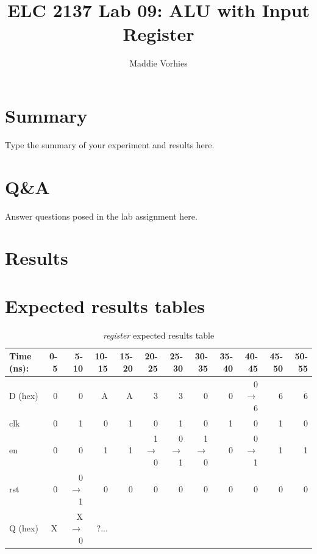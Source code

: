 \documentclass[11pt]{article}
\begin{document}
\title{ELC 2137 Lab 09: ALU with Input Register}
\author{Maddie Vorhies}

\maketitle


\section*{Summary}

Type the summary of your experiment and results here.  


\section*{Q\&A}

Answer questions posed in the lab assignment here.


\section*{Results}

\section*{Expected results tables}

\begin{table}[ht]\centering
	\caption{\textit{register} expected results table}
	\label{ALU:tbl:register_ERT}\medskip
	\begin{tabular}{l|rrrrrrrrrrr}
		Time (ns): & 0-5 & 5-10 & 10-15 & 15-20 & 20-25 & 25-30 & 30-35 & 35-40 & 40-45 & 45-50 & 50-55 \\
		\midrule
		D (hex) & 0 & 0 	  & A & A & 3 	    & 3 	  & 0 	    & 0 & 0$\to$6 & 6 & 6 \\
		clk     & 0 & 1 	  & 0 & 1 & 0 	    & 1 	  & 0 	    & 1 & 0 	  & 1 & 0 \\
		en  	& 0 & 0 	  & 1 & 1 & 1$\to$0 & 0$\to$1 & 1$\to$0 & 0 & 0$\to$1 & 1 & 1 \\
		rst 	& 0 & 0$\to$1 & 0 & 0 & 0 		& 0 	  & 0		& 0 & 0		  & 0 & 0 \\
		\midrule
		Q (hex) & X & X$\to$0 & ?... &  &  &  & & & & & \\
		\bottomrule
	\end{tabular}
\end{table}
\end{document}

